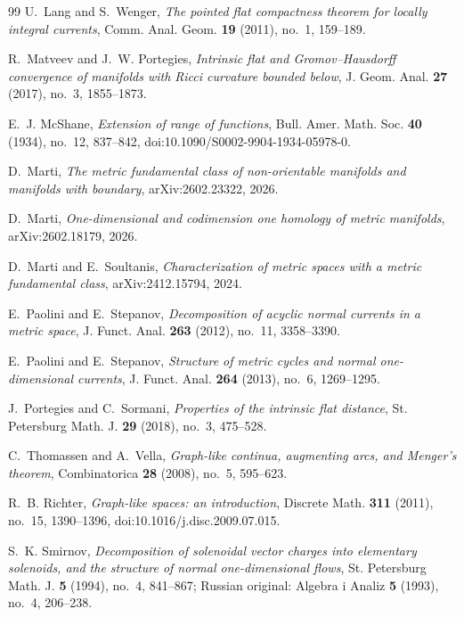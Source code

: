 \documentclass[11pt]{article}
\theoremstyle{remark}
\begin{document}
\begin{thebibliography}{99}
U.~Lang and S.~Wenger,
\emph{The pointed flat compactness theorem for locally integral currents},
Comm. Anal. Geom. \textbf{19} (2011), no.~1, 159--189.

R.~Matveev and J.~W. Portegies,
\emph{Intrinsic flat and Gromov--Hausdorff convergence of manifolds with Ricci curvature bounded below},
J. Geom. Anal. \textbf{27} (2017), no.~3, 1855--1873.

E.~J. McShane,
\emph{Extension of range of functions},
Bull. Amer. Math. Soc. \textbf{40} (1934), no.~12, 837--842,
doi:10.1090/S0002-9904-1934-05978-0.

D.~Marti,
\emph{The metric fundamental class of non-orientable manifolds and manifolds with boundary},
arXiv:2602.23322, 2026.

D.~Marti,
\emph{One-dimensional and codimension one homology of metric manifolds},
arXiv:2602.18179, 2026.

D.~Marti and E.~Soultanis,
\emph{Characterization of metric spaces with a metric fundamental class},
arXiv:2412.15794, 2024.

E.~Paolini and E.~Stepanov,
\emph{Decomposition of acyclic normal currents in a metric space},
J. Funct. Anal. \textbf{263} (2012), no.~11, 3358--3390.

E.~Paolini and E.~Stepanov,
\emph{Structure of metric cycles and normal one-dimensional currents},
J. Funct. Anal. \textbf{264} (2013), no.~6, 1269--1295.

J.~Portegies and C.~Sormani,
\emph{Properties of the intrinsic flat distance},
St. Petersburg Math. J. \textbf{29} (2018), no.~3, 475--528.

C.~Thomassen and A.~Vella,
\emph{Graph-like continua, augmenting arcs, and Menger's theorem},
Combinatorica \textbf{28} (2008), no.~5, 595--623.

R.~B. Richter,
\emph{Graph-like spaces: an introduction},
Discrete Math. \textbf{311} (2011), no.~15, 1390--1396, doi:10.1016/j.disc.2009.07.015.

S.~K. Smirnov,
\emph{Decomposition of solenoidal vector charges into elementary solenoids, and the structure of normal one-dimensional flows},
St. Petersburg Math. J. \textbf{5} (1994), no.~4, 841--867; Russian original: Algebra i Analiz \textbf{5} (1993), no.~4, 206--238.


\end{thebibliography}
\end{document}
